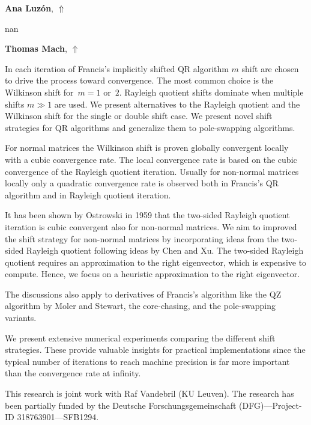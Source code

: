 \documentclass[ILAS2025-program.tex]{subfiles}
\begin{document}
\hypertarget{down0413}{}\begin{ilasabstract}
    
\textbf{Ana Luzón},  \hfill \hyperlink{up0413}{$\Uparrow$}
    
    
\mtskip
    nan
\end{ilasabstract}
    

\hypertarget{down0410}{}\begin{ilasabstract}
    
\textbf{Thomas Mach},  \hfill \hyperlink{up0410}{$\Uparrow$}
    
    
\mtskip
    In each iteration of Francis's implicitly shifted QR algorithm $m$ shift are
chosen to drive the process toward convergence. The most common choice is the
Wilkinson shift for~$m=1$ or~$2$. Rayleigh quotient shifts dominate when
multiple shifts $m\gg 1$ are used. We present alternatives to the Rayleigh
quotient and the Wilkinson shift for the single or double shift case. We present
novel shift strategies for QR algorithms and generalize them to pole-swapping
algorithms.

For normal matrices the Wilkinson shift is proven globally convergent locally
with a cubic convergence rate. The local convergence rate is based on the cubic
convergence of the Rayleigh quotient iteration. Usually for non-normal matrices
locally only a quadratic convergence rate is observed both in Francis's QR
algorithm and in Rayleigh quotient iteration.

It has been shown by Ostrowski in 1959 that the two-sided Rayleigh quotient
iteration is cubic convergent also for non-normal matrices.  We aim to improved
the shift strategy for non-normal matrices by incorporating ideas from the
two-sided Rayleigh quotient following ideas by Chen and Xu. The two-sided
Rayleigh quotient requires an approximation to the right eigenvector, which is
expensive to compute. Hence, we focus on a heuristic approximation to the right
eigenvector.

The discussions also apply to derivatives of Francis's algorithm like the QZ
algorithm by Moler and Stewart, the core-chasing, and the pole-swapping
variants.

We present extensive numerical experiments comparing the different shift
strategies. These provide valuable insights for practical implementations since
the typical number of iterations to reach machine precision is far more
important than the convergence rate at infinity.

This research is joint work with Raf Vandebril (KU Leuven). The research has
been partially funded by the Deutsche Forschungsgemeinschaft (DFG)---Project-ID
318763901---SFB1294.


\end{ilasabstract}
    
\end{document}
